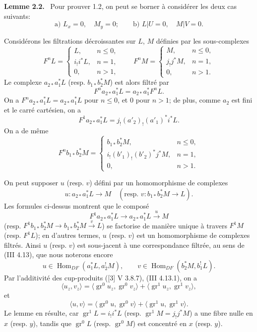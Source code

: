 \documentclass[11pt]{article}
\newenvironment{statement}[1]{\par\medskip\noindent\textbf{#1.}\ }{\par\medskip}
\DeclareMathOperator{\Hom}{Hom}
\providecommand{\Hom}{\operatorname{Hom}}
\begin{document}
\begin{statement}{Lemme 2.2}
Pour prouver 1.2, on peut se borner à considérer les deux cas suivants:
\[
\text{a) } L_x=0,\quad M_y=0;\qquad
\text{b) } L|U=0,\quad M|V=0 .
\]
\end{statement}

Considérons les filtrations décroissantes sur $L$, $M$ définies par les sous-complexes
\[
F^nL=
\begin{cases}
L,& n\le 0,\\
i_!i^*L,& n=1,\\
0,& n>1,
\end{cases}
\qquad
F^nM=
\begin{cases}
M,& n\le 0,\\
j_!j^*M,& n=1,\\
0,& n>1.
\end{cases}
\]
Le complexe $a_{2*}a_1^*L$ (resp. $b_{1*}b_2^*M$) est alors filtré par
\[
F^n a_{2*}a_1^*L=a_{2*}a_1^*F^nL.
\]
On a $F^n a_{2*}a_1^*L=a_{2*}a_1^*L$ pour $n\le 0$, et $0$ pour $n>1$; de plus, comme $a_2$ est fini et le carré cartésien, on a
\[
F^1a_{2*}a_1^*L=j_!(a'_2)_!(a'_1)^*i^*L.
\]
On a de même
\[
F^n b_{1*}b_2^*M=
\begin{cases}
b_{1*}b_2^*M,& n\le 0,\\
i_!(b'_1)_!(b'_2)^*j^*M,& n=1,\\
0,& n>1.
\end{cases}
\]

On peut supposer $u$ (resp. $v$) défini par un homomorphisme de complexes
\[
u:a_{2*}a_1^*L\longrightarrow M
\quad
(\text{resp. }v:b_{1*}b_2^*M\longrightarrow L).
\]
Les formules ci-dessus montrent que le composé
\[
F^1a_{2*}a_1^*L\longrightarrow a_{2*}a_1^*L\xrightarrow{u}M
\]
(resp. $F^1b_{1*}b_2^*M\to b_{1*}b_2^*M\xrightarrow{v}L$) se factorise de manière unique à travers $F^1M$ (resp. $F^1L$); en d'autres termes, $u$ (resp. $v$) est un homomorphisme de complexes filtrés. Ainsi $u$ (resp. $v$) est sous-jacent à une correspondance filtrée, au sens de (III 4.13), que nous noterons encore
\[
u\in\Hom_{DF}(a_1^*L,a_2^!M),\qquad
v\in\Hom_{DF}(b_2^*M,b_1^!L).
\]
Par l'additivité des cup-produits ([3] V 3.8.7), (III 4.13.1), on a
\[
\langle u_z,v_z\rangle
 =\langle \operatorname{gr}^0u_z,\operatorname{gr}^0v_z\rangle
 +\langle \operatorname{gr}^1u_z,\operatorname{gr}^1v_z\rangle,
\]
et
\[
\langle u,v\rangle
 =\langle \operatorname{gr}^0u,\operatorname{gr}^0v\rangle
 +\langle \operatorname{gr}^1u,\operatorname{gr}^1v\rangle.
\]
Le lemme en résulte, car $\operatorname{gr}^1L=i_!i^*L$ (resp. $\operatorname{gr}^1M=j_!j^*M$) a une fibre nulle en $x$ (resp. $y$), tandis que $\operatorname{gr}^0L$ (resp. $\operatorname{gr}^0M$) est concentré en $x$ (resp. $y$).
\end{document}
